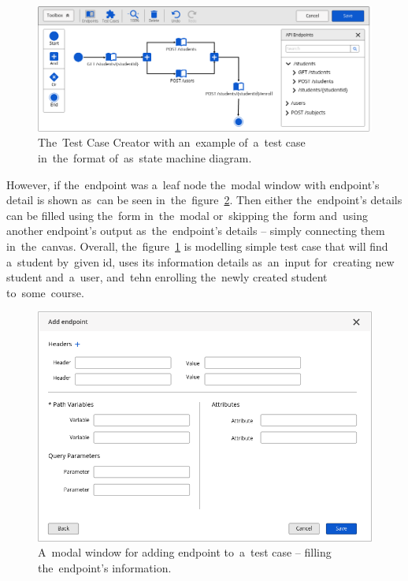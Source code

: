 \begin{figure}[!hbt]
	\centering
	\includegraphics[scale=0.4]{./designs/drafts-1.0/test-case-creator.png}
	\caption{The~Test Case Creator with an~example of~a~test case in~the~format
	of~as~state machine diagram.}
	\label{test-case-creator}
\end{figure}

However, if the~endpoint was a~leaf node the~modal window with endpoint's detail
is shown as~can be seen in~the~figure~\ref{add-endpoint-2}. Then either
the~endpoint's details can be filled using the~form in~the~modal or~skipping
the~form and~using another endpoint's output as~the~endpoint's details -- simply
connecting them in~the~canvas. Overall, the~figure~\ref{test-case-creator} is
modelling simple test case that will find a~student by~given id, uses its
information details as~an~input for~creating new student and~a~user, and~tehn
enrolling the~newly created student to~some~course.

\begin{figure}[!hbt]
	\centering
	\includegraphics[scale=0.4]{./designs/drafts-1.0/add-endpoint-2.png}
	\caption{A~modal window for adding endpoint to~a~test case -- filling
	the~endpoint's information.}
	\label{add-endpoint-2}
\end{figure}

